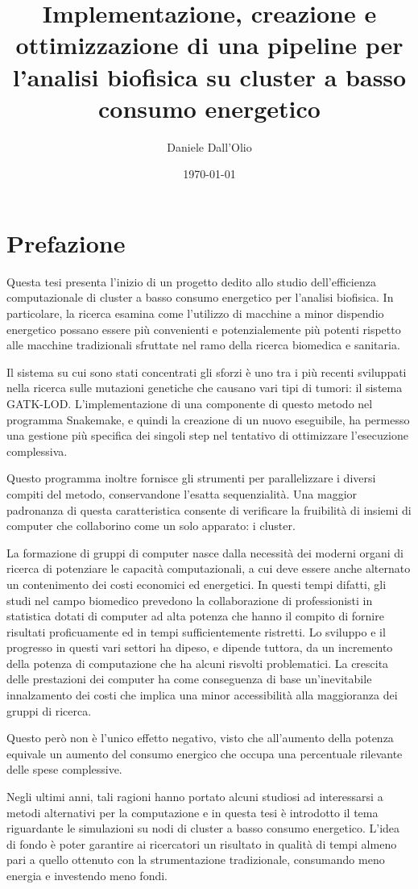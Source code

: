 \documentclass[12pt, a4paper]{report}
\title{Implementazione, creazione e ottimizzazione di una pipeline per l'analisi biofisica su cluster a basso consumo energetico}
\author{Daniele Dall'Olio}
\date{\today}
\begin{document}
\section*{Prefazione}
Questa tesi presenta l'inizio di un progetto dedito allo studio dell'efficienza computazionale di cluster a basso consumo energetico per l'analisi biofisica.
In particolare, la ricerca esamina come l'utilizzo di macchine a minor dispendio energetico possano essere più convenienti e potenzialemente più potenti rispetto alle macchine tradizionali sfruttate nel ramo della ricerca biomedica e sanitaria.


Il sistema su cui sono stati concentrati gli sforzi è uno tra i più recenti sviluppati nella ricerca sulle mutazioni genetiche che causano vari tipi di tumori: il sistema GATK-LOD.
L'implementazione di una componente di questo metodo nel programma Snakemake, e quindi la creazione di un nuovo eseguibile, ha permesso una gestione più specifica dei singoli step nel tentativo di ottimizzare l'esecuzione complessiva. 

Questo programma inoltre fornisce gli strumenti per parallelizzare i diversi compiti del metodo, conservandone l'esatta sequenzialità.
Una maggior padronanza di questa caratteristica consente di verificare la fruibilità di insiemi di computer che collaborino come un solo apparato: i cluster.

La formazione di gruppi di computer nasce dalla necessità dei moderni organi di ricerca di potenziare le capacità computazionali, a cui deve essere anche alternato un contenimento dei costi economici ed energetici.
In questi tempi difatti, gli studi nel campo biomedico prevedono la collaborazione di professionisti in statistica dotati di computer ad alta potenza che hanno il compito di fornire risultati proficuamente ed in tempi sufficientemente ristretti.
Lo sviluppo e il progresso in questi vari settori ha dipeso, e dipende tuttora, da un incremento della potenza di computazione che ha alcuni risvolti problematici.
La crescita delle prestazioni dei computer ha come conseguenza di base un'inevitabile innalzamento dei costi che implica una minor accessibilità alla maggioranza dei gruppi di ricerca.

Questo però non è l'unico effetto negativo, visto che all'aumento della potenza equivale un aumento del consumo energico che occupa una percentuale rilevante delle spese complessive.

Negli ultimi anni, tali ragioni hanno portato alcuni studiosi ad interessarsi a metodi alternativi per la computazione e in questa tesi è introdotto il tema riguardante le simulazioni su nodi di cluster a basso consumo energetico.
L'idea di fondo è poter garantire ai ricercatori un risultato in qualità di tempi almeno pari a quello ottenuto con la strumentazione tradizionale, consumando meno energia e investendo meno fondi.
\end{document}
